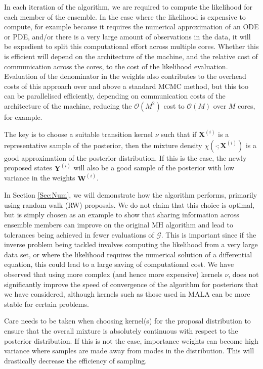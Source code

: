 \documentclass[final]{siamltex}
\newcommand{\G}{\mathcal{G}}
\newcommand{\X}{{\mathbf X}}
\newcommand{\Y}{{\mathbf Y}}
\newcommand{\W}{{\mathbf W}}
\begin{document}
In each iteration of the algorithm, we are required to compute the
likelihood for each member of the ensemble. In the case where the
likelihood is expensive to compute, for example because it requires
the numerical approximation of an ODE or PDE, and/or there is a very
large amount of observations in the data, it will be expedient to
split this computational effort across multiple cores. Whether this is
efficient will depend on the architecture of the machine, and the
relative cost of communication across the cores, to the cost of the
likelihood evaluation. Evaluation of the denominator in the weights
also contributes to the overhead costs of this approach over and above
a standard MCMC method, but this too can be parallelised efficiently,
depending on communication costs of the architecture of the machine,
reducing the $\mathcal{O}(M^2)$ cost to $\mathcal{O}(M)$ over $M$
cores, for example.

The key is to choose a suitable transition kernel $\nu$ such that
if $\mathbf{X}^{(i)}$ is a representative sample of the posterior,
then the mixture density $\chi(\cdot;\X^{(i)})$ is a good
approximation of the posterior distribution. If this is the case,
the newly proposed states $\Y^{(i)}$ will also be a good sample of the
posterior with low variance in the weights $\W^{(i)}$.

In Section \ref{Sec:Num}, we will demonstrate how the algorithm
performs, primarily using random walk (RW) proposals. We do not claim that this choice is optimal, but
is simply chosen as an example to show that sharing information across
ensemble members can improve on the original MH algorithm and lead to
tolerances being achieved in fewer evaluations of $\G$. This is important since if
the inverse problem being tackled involves computing
the likelihood from a very large data set, or where the likelihood
requires the numerical solution of a differential equation, this could lead to a
large saving of computational cost. We have observed that
using more complex (and hence more expensive) kernels $\nu$, does not
significantly improve the speed of convergence of the algorithm for
posteriors that we have considered, although kernels such as those
used in MALA can be more stable for certain problems\cite{Paul}.

Care needs to be taken when choosing kernel(s) for the proposal distribution to
ensure that the overall mixture is absolutely continuous with respect to
the posterior distribution. If this is not the case, importance
weights can become high variance where samples are made away from
modes in the distribution. This will
drastically decrease the efficiency of sampling.
\end{document}
